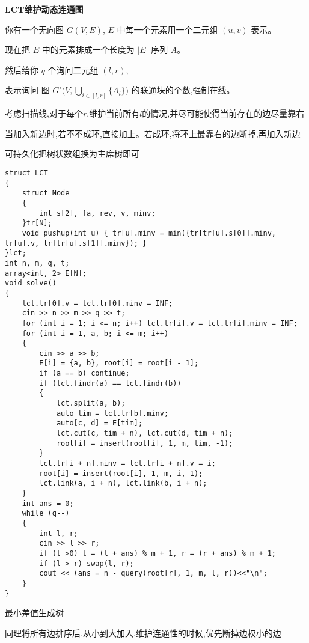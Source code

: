 \documentclass[a4paper, fontset=none]{ctexart}
\begin{document}
\textbf{LCT维护动态连通图}

你有一个无向图 $G( V, E )$, $E$ 中每一个元素用一个二元组 $( u, v )$ 表示。

现在把 $E$ 中的元素排成一个长度为 $|E|$ 序列 $A$。

然后给你 $q$ 个询问二元组 $( l, r )$,

表示询问 图 $ G'\big( V, \mathop{\bigcup}\limits_{ i \in [l, r] } \{A_i\} \big) $ 的联通块的个数,强制在线。

考虑扫描线,对于每个$r$,维护当前所有$l$的情况,并尽可能使得当前存在的边尽量靠右

当加入新边时,若不不成环,直接加上。若成环,将环上最靠右的边断掉,再加入新边

可持久化把树状数组换为主席树即可

\begin{verbatim}
struct LCT
{
    struct Node
    {
        int s[2], fa, rev, v, minv;
    }tr[N];
    void pushup(int u) { tr[u].minv = min({tr[tr[u].s[0]].minv, tr[u].v, tr[tr[u].s[1]].minv}); }
}lct;
int n, m, q, t;
array<int, 2> E[N];
void solve()
{
    lct.tr[0].v = lct.tr[0].minv = INF;
    cin >> n >> m >> q >> t;
    for (int i = 1; i <= n; i++) lct.tr[i].v = lct.tr[i].minv = INF;
    for (int i = 1, a, b; i <= m; i++)
    {
        cin >> a >> b;
        E[i] = {a, b}, root[i] = root[i - 1];
        if (a == b) continue;
        if (lct.findr(a) == lct.findr(b))
        {
            lct.split(a, b);
            auto tim = lct.tr[b].minv;
            auto[c, d] = E[tim];
            lct.cut(c, tim + n), lct.cut(d, tim + n);
            root[i] = insert(root[i], 1, m, tim, -1);
        }
        lct.tr[i + n].minv = lct.tr[i + n].v = i;
        root[i] = insert(root[i], 1, m, i, 1);
        lct.link(a, i + n), lct.link(b, i + n);
    }
    int ans = 0;
    while (q--)
    {
        int l, r;
        cin >> l >> r;
        if (t >0) l = (l + ans) % m + 1, r = (r + ans) % m + 1;
        if (l > r) swap(l, r);
        cout << (ans = n - query(root[r], 1, m, l, r))<<"\n";
    }
}
\end{verbatim}

最小差值生成树

同理将所有边排序后,从小到大加入,维护连通性的时候,优先断掉边权小的边
\end{document}
